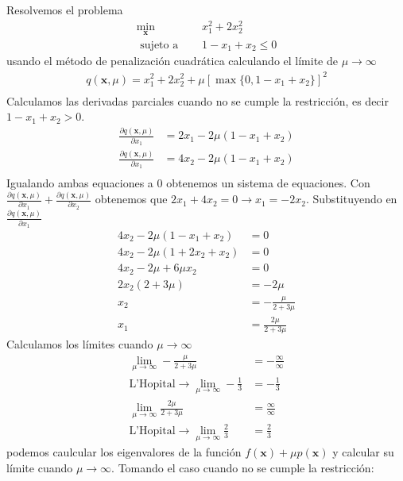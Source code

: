 \documentclass{article}
\begin{document}
\begin{multicols}{2}
Resolvemos el problema 
\begin{align*}
\min_{\boldsymbol{x}}&\quad x_1^2 + 2 x_2^2\\
\text{ sujeto a }&\quad 1-x_1+x_2 \leq 0
\end{align*}
usando el método de penalización cuadrática calculando el límite de $\mu \rightarrow \infty $
\begin{align*}
q(\boldsymbol{x}, \mu) = x_1^2 + 2 x_2^2 + \mu[\max\{ 0, 1-x_1 + x_2 \}]^2\\
\end{align*}
Calculamos las derivadas parciales cuando no se cumple la restricción, es decir $1-x_1 + x_2 > 0$.
\begin{align*}
\frac{\partial q(\boldsymbol{x}, \mu)}{\partial x_1} &= 2x_1 - 2\mu(1-x_1+x_2)\\
\frac{\partial q(\boldsymbol{x}, \mu)}{\partial x_1} &= 4x_2 - 2\mu(1-x_1+x_2)\\
\end{align*}
Igualando ambas equaciones a $0$ obtenemos un sistema de equaciones. Con $\frac{\partial q(\boldsymbol{x}, \mu)}{\partial x_1} + \frac{\partial q(\boldsymbol{x}, \mu)}{\partial x_2}$ obtenemos que $2x_1 + 4x_2 = 0 \rightarrow x_1 = -2x_2$. Substituyendo en $\frac{\partial q(\boldsymbol{x}, \mu)}{\partial x_1}$
\begin{align*}
4x_2 - 2\mu(1-x_1+x_2) &=0\\
4x_2 - 2\mu(1+2x_2+x_2) &=0\\
4x_2 - 2\mu +6\mu x_2 &=0\\
2x_2(2+3\mu) &= -2\mu\\
x_2 &= -\frac{\mu}{2+3\mu}\\
x_1 &= \frac{2\mu}{2+3\mu}
\end{align*}
Calculamos los límites cuando $\mu \rightarrow \infty$
\begin{align*}
\lim_{\mu\rightarrow\infty} -\frac{\mu}{2+3\mu} &= -\frac{\infty}{\infty}\\
\text{L'Hopital}\rightarrow \lim_{\mu\rightarrow\infty} -\frac{1}{3} &= -\frac{1}{3}\\
\lim_{\mu\rightarrow\infty} \frac{2\mu}{2+3\mu} &= \frac{\infty}{\infty}\\
\text{L'Hopital}\rightarrow \lim_{\mu\rightarrow\infty} \frac{2}{3} &= \frac{2}{3}
\end{align*}
podemos caulcular los eigenvalores de la función $f(\boldsymbol{x}) + \mu p(\boldsymbol{x})$ y calcular su límite cuando $\mu \rightarrow \infty$. Tomando el caso cuando no se cumple la restricción:

\end{multicols}
\end{document}
